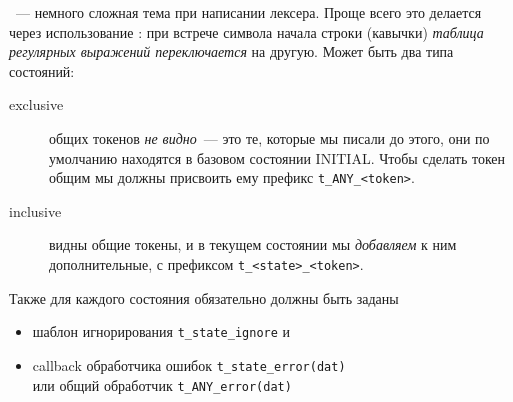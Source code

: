 \clearpage
{}
\ --- немного сложная тема при написании лексера. Проще всего
это делается через использование : при встрече символа начала
строки (кавычки) \emph{таблица регулярных выражений переключается} на другую.
Может быть два типа состояний:

\begin{description}
\item[exclusive] общих токенов \emph{не видно}\ --- это те, которые мы писали до
этого, они по умолчанию находятся в базовом состоянии INITIAL.
Чтобы сделать токен общим мы должны присвоить ему префикс \verb|t_ANY_<token>|. 
\item[inclusive] видны общие токены, и в текущем состоянии мы \emph{добавляем} к
ним дополнительные, с префиксом \verb|t_<state>_<token>|.
\end{description}

\clearpage
Также для каждого состояния обязательно должны быть заданы
\begin{itemize}
  \item 
 шаблон игнорирования \verb|t_state_ignore| и
  \item 
 callback обработчика ошибок \verb|t_state_error(dat)|\\
 или общий обработчик \verb|t_ANY_error(dat)|
\end{itemize}
 
\secup